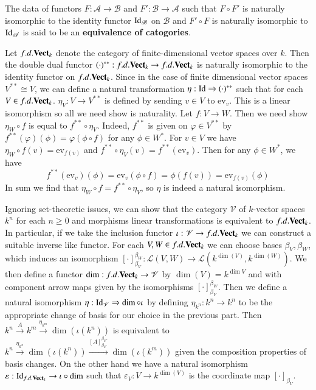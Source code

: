 The data of functors $F:\mathscr{A}\rightarrow \mathscr{B}$ and $F':\mathscr{B}\rightarrow\mathscr{A}$ such that $F\circ F'$ is naturally isomorphic to the identity functor $\operatorname{Id}_{\mathscr{B}}$ on $\mathscr{B}$ and $F'\circ F$ is naturally isomorphic to $\operatorname{Id}_{\mathscr{A}}$ is said to be an \textbf{equivalence of catogories}. 

\begin{example}
    Let $f.d.\normalfont\textbf{Vect}_{k}$ denote the category of finite-dimensional vector spaces over $k$. Then the double dual functor $(\cdot)^{**}:f.d.\normalfont\textbf{Vect}_{k}\rightarrow f.d.\normalfont\textbf{Vect}_{k}$ is naturally isomorphic to the identity functor on $f.d.\normalfont\textbf{Vect}_{k}$. Since in the case of finite dimensional vector spaces $V^{**}\cong V$, we can define a natural transformation $\eta:\operatorname{Id}\Rightarrow (\cdot)^{**}$ such that for each $V \in f.d.\normalfont\textbf{Vect}_{k}$. $\eta_V:V\rightarrow V^{**}$ is defined by sending $v \in V$ to $\text{ev}_v$. This is a linear isomorphism so all we need show is naturality. Let $f:V\rightarrow W$. Then we need show $\eta_W\circ f$ is equal to $f^{**}\circ \eta_V$. Indeed, $f^{**}$ is given on $\varphi \in V^{**}$ by $f^{**}(\varphi)(\phi) = \varphi(\phi\circ f)$ for any $\phi \in W^{*}$. For $v \in V$ we have $\eta_W\circ f(v) = \text{ev}_{f(v)}$ and $f^{**}\circ\eta_V(v) = f^{**}(\text{ev}_v)$. Then for any $\phi \in W^*$, we have \begin{equation*}
        f^{**}(\text{ev}_v)(\phi) = \text{ev}_v(\phi\circ f) = \phi(f(v)) = \text{ev}_{f(v)}(\phi)
    \end{equation*}
    In sum we find that $\eta_W\circ f = f^{**}\circ \eta_V$, so $\eta$ is indeed a natural isomorphism.
\end{example}

Ignoring set-theoretic issues, we can show that the category $\mathscr{V}$ of $k$-vector spaces $k^n$ for each $n \geq 0$ and morphisms linear transformations is equivalent to $f.d.\normalfont\textbf{Vect}_{k}$. In particular, if we take the inclusion functor $\iota:\mathscr{V}\rightarrow f.d.\normalfont\textbf{Vect}_{k}$ we can construct a suitable inverse like functor. For each $V,W \in f.d.\normalfont\textbf{Vect}_{k}$ we can choose bases $\beta_V,\beta_W$, which induces an isomorphism $[\cdot]^{\beta_W}_{\beta_V}:\mathscr{L}(V,W)\rightarrow \mathscr{L}(k^{\dim(V)},k^{\dim(W)})$. We then define a functor $\dim:f.d.\normalfont\textbf{Vect}_{k}\rightarrow \mathscr{V}$ by $\dim(V) = k^{\dim V}$ and with component arrow maps given by the isomorphisms $[\cdot]_{\beta_V}^{\beta_W}$. Then we define a natural isomorphism $\eta:\operatorname{Id}_{\mathscr{V}}\Rightarrow \dim\circ \iota$ by defining $\eta_{k^n}:k^n\rightarrow k^n$ to be the appropriate change of basis for our choice in the previous part. Then $k^n\xrightarrow{A}k^m\xrightarrow{\eta_{k^m}}\dim(\iota(k^n))$ is equivalent to $k^n\xrightarrow{\eta_{k^n}}\dim(\iota(k^n))\xrightarrow{[A]_{\beta_{k^n}}^{\beta_{k^m}}}\dim(\iota(k^m))$ given the composition properties of basis changes. On the other hand we have a natural isomorphism $\varepsilon:\operatorname{Id}_{f.d.\normalfont\textbf{Vect}_{k}}\rightarrow \iota\circ \dim$ such that $\varepsilon_V:V\rightarrow k^{\dim(V)}$ is the coordinate map $[\cdot]_{\beta_V}$.

